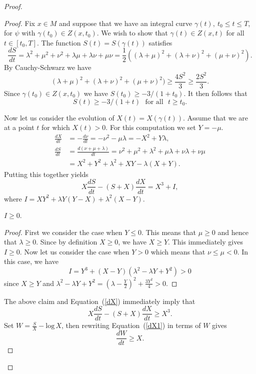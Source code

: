 \begin{proof}
\begin{proof}
Fix $x\in M$ and suppose that we have an integral curve $\gamma(t),\
t_0\le t\le T$, for $\psi$ with $\gamma(t_0)\in Z(x,t_0)$. We wish
to show that $\gamma(t)\in Z(x,t)$ for all $t\in [t_0,T]$. The
function $S(t)=S(\gamma(t))$ satisfies
$$\frac{dS}{dt}=\lambda^2+\mu^2+\nu^2+\lambda\mu+\lambda\nu+\mu\nu=\frac{1}{2}\left((\lambda+\mu)^2+
(\lambda+\nu)^2+(\mu+\nu)^2\right).$$ By Cauchy-Schwarz we have
$$(\lambda+\mu)^2+
(\lambda+\nu)^2+(\mu+\nu)^2)\ge \frac{4S^2}{3}\ge \frac{2S^2}{3}.$$ Since
$\gamma(t_0)\in Z(x,t_0)$ we have $S(t_0)\ge -3/(1+t_0)$. It then follows that
\begin{equation}\label{Sineq}
S(t)\ge -3/(1+t)\ \ \ \text{for all}\ \ \  t\ge t_0.
\end{equation}


Now let us consider the evolution of $X(t)=X(\gamma(t))$. Assume
that we are at a point $t$ for which $X(t)>0$. For this computation
we set $Y=-\mu$.
\begin{align*}
\frac{dX}{dt}&=-\frac{d\nu}{dt}=-\nu^2-\mu\lambda =-X^2+Y\lambda,\\
\frac{dS}{dt}&=\frac{d(\nu+\mu+\lambda)}{dt}
=\nu^2+\mu^2+\lambda^2+\mu\lambda+\nu\lambda+\nu\mu\\
&=X^2+Y^2+\lambda^2+XY-\lambda(X+Y).
\end{align*}
Putting this together yields
\begin{equation}\label{dX}
X\frac{dS}{dt}-(S+X)\frac{dX}{dt} =X^3+I, \end{equation}
 where
$I=XY^2+\lambda Y(Y-X)+\lambda^2(X-Y)$.
\begin{claim}
\label{claim:pinching-auxiliary-quantity-nonnegative}  $I\geq 0$.
\end{claim}

\begin{proof}

 First we consider the case when
 $Y\leq 0$. This means that  $\mu\geq 0$ and
 hence that $\lambda\geq0$. Since by definition $X\ge 0$, we have $X\ge  Y$.
This immediately gives  $I\geq 0$. Now let us consider the case when
$Y>0$ which means that $\nu\le \mu<0$. In this case, we have
\[ I=Y^3+(X-Y)(\lambda^2-\lambda Y+Y^2)>0 \]
since $X\geq Y$ and $\lambda^2-\lambda
Y+Y^2=(\lambda-\frac{Y}{2})^2+\frac{3Y^2}{4}>0$.
\end{proof}

The above claim and Equation~(\ref{dX}) immediately imply that
\begin{equation}\label{dX1}
 X\frac{dS}{dt}-(S+X)\frac{dX}{dt}\geq
X^3. \end{equation}
 Set $W=\frac{S}{X}-\mathrm{log}\,X$, then rewriting
 Equation~(\ref{dX1})
 in terms of $W$ gives
\begin{equation}\label{dW}
\frac{dW}{dt}\geq X.
\end{equation}


\end{proof}
\end{proof}
